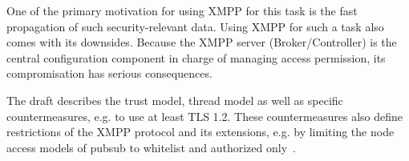 One of the primary motivation for using XMPP for this task is the fast propagation of such security-relevant data.
Using XMPP for such a task also comes with its downsides. Because the XMPP server (Broker/Controller) is the central configuration component in charge of managing access permission, its compromisation has serious consequences.

The draft describes the trust model, thread model as well as specific countermeasures, e.g. to use at least TLS 1.2. These countermeasures also define restrictions of the XMPP protocol and its extensions, e.g. by limiting the node access models of \gls{pubsub} to whitelist and authorized only~\cite{ietf-mile-xmpp-grid-05}.
